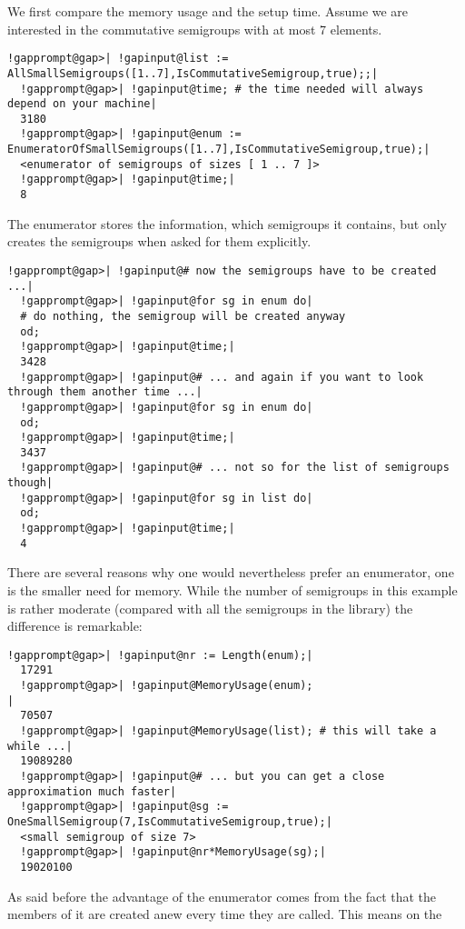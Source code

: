 \documentclass[a4paper,11pt]{report}
\begin{document}
{{{ We first compare the memory usage and the setup time. Assume we are interested
in the commutative semigroups with at most 7 elements. 
\begin{Verbatim}[commandchars=!@|,fontsize=\small,frame=single,label=Example]
  !gapprompt@gap>| !gapinput@list := AllSmallSemigroups([1..7],IsCommutativeSemigroup,true);;|
  !gapprompt@gap>| !gapinput@time; # the time needed will always depend on your machine|
  3180
  !gapprompt@gap>| !gapinput@enum := EnumeratorOfSmallSemigroups([1..7],IsCommutativeSemigroup,true);|
  <enumerator of semigroups of sizes [ 1 .. 7 ]>
  !gapprompt@gap>| !gapinput@time;|
  8
\end{Verbatim}
 The enumerator stores the information, which semigroups it contains, but only
creates the semigroups when asked for them explicitly. 
\begin{Verbatim}[commandchars=!@|,fontsize=\small,frame=single,label=Example]
  !gapprompt@gap>| !gapinput@# now the semigroups have to be created ...|
  !gapprompt@gap>| !gapinput@for sg in enum do|
  # do nothing, the semigroup will be created anyway
  od;
  !gapprompt@gap>| !gapinput@time;|
  3428
  !gapprompt@gap>| !gapinput@# ... and again if you want to look through them another time ...|
  !gapprompt@gap>| !gapinput@for sg in enum do|
  od;
  !gapprompt@gap>| !gapinput@time;|
  3437
  !gapprompt@gap>| !gapinput@# ... not so for the list of semigroups though|
  !gapprompt@gap>| !gapinput@for sg in list do|
  od;
  !gapprompt@gap>| !gapinput@time;|
  4
\end{Verbatim}
 There are several reasons why one would nevertheless prefer an enumerator, one
is the smaller need for memory. While the number of semigroups in this example
is rather moderate (compared with all the semigroups in the library) the
difference is remarkable: 
\begin{Verbatim}[commandchars=!@|,fontsize=\small,frame=single,label=Example]
  !gapprompt@gap>| !gapinput@nr := Length(enum);|
  17291
  !gapprompt@gap>| !gapinput@MemoryUsage(enum);                                 |
  70507
  !gapprompt@gap>| !gapinput@MemoryUsage(list); # this will take a while ...|
  19089280
  !gapprompt@gap>| !gapinput@# ... but you can get a close approximation much faster|
  !gapprompt@gap>| !gapinput@sg := OneSmallSemigroup(7,IsCommutativeSemigroup,true);|
  <small semigroup of size 7>
  !gapprompt@gap>| !gapinput@nr*MemoryUsage(sg);|
  19020100
\end{Verbatim}
 As said before the advantage of the enumerator comes from the fact that the
members of it are created anew every time they are called. This means on the
}}}
\end{document}
